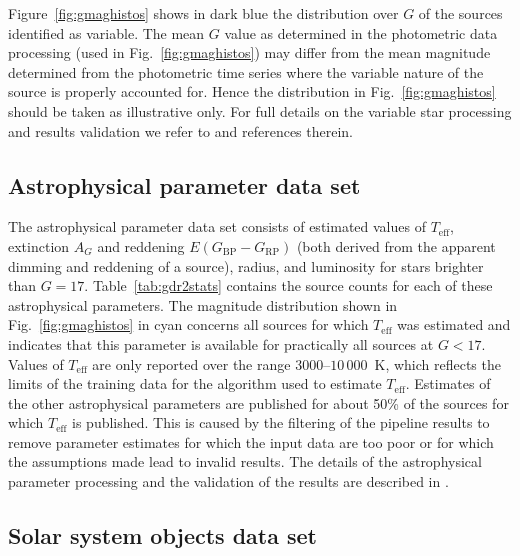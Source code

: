 \documentclass[longauth]{aa_gaia} %
\newcommand\figref[1]{Fig.~\ref{#1}}
\newcommand\figrefalt[1]{Figure~\ref{#1}}
\newcommand\tabref[1]{Table~\ref{#1}}
\newcommand\gbp{\ensuremath{G_\mathrm{BP}}}
\newcommand\grp{\ensuremath{G_\mathrm{RP}}}
\newcommand\teff{\ensuremath{T_\mathrm{eff}}}
\newcommand\ag{\ensuremath{A_G}}
\newcommand\ebpminrp{\ensuremath{E(\gbp-\grp)}}
\begin{document}
\figrefalt{fig:gmaghistos} shows in dark blue the distribution over $G$ of the sources identified as
variable. The mean $G$ value as determined in the photometric data processing (used in
\figref{fig:gmaghistos}) may differ from the mean magnitude determined from the photometric time
series where the variable nature of the source is properly accounted for. Hence the distribution in
\figref{fig:gmaghistos} should be taken as illustrative only. For full details on the variable star
processing and results validation we refer to \cite{DR2-DPACP-49} and references therein.

\subsection{Astrophysical parameter data set} 

The astrophysical parameter data set consists of estimated values of {\teff}, extinction {\ag} and
reddening {\ebpminrp} (both derived from the apparent dimming and reddening of a source), radius,
and luminosity for stars brighter than $G=17$. \tabref{tab:gdr2stats} contains the source counts for
each of these astrophysical parameters. The magnitude distribution shown in \figref{fig:gmaghistos}
in cyan concerns all sources for which {\teff} was estimated and indicates that this parameter is
available for practically all sources at $G<17$.  Values of {\teff} are only reported over the range
$3000$--$10\,000$~K, which reflects the limits of the training data for the algorithm used to
estimate \teff. Estimates of the other astrophysical parameters are published for about 50\% of the
sources for which {\teff} is published. This is caused by the filtering of the pipeline results to
remove parameter estimates for which the input data are too poor or for which the assumptions made
lead to invalid results. The details of the astrophysical parameter processing and the validation of
the results are described in \cite{DR2-DPACP-43}.

\subsection{Solar system objects data set}
\end{document}
